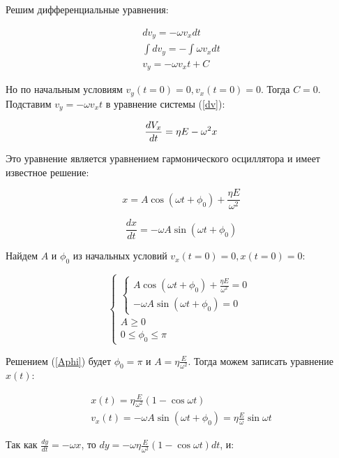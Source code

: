 Решим дифференциальные уравнения:

\begin{gather}
	\label{diff}
	 dv_y=-\omega{}v_x{}dt\\
	 \int dv_y=-\int\omega{}v_x{}dt\\
	 v_y=-\omega{}v_x{}t+C
\end{gather}

Но по начальным условиям $v_y(t=0)=0,v_x(t=0)=0$. Тогда $C=0$. Подставим $v_y=-\omega{}v_x{}t$ в уравнение системы (\ref{dv}):

\begin{equation}
	\frac{dV_x}{dt}=\eta{}E-\omega^2{}x\\
\end{equation}

Это уравнение является уравнением гармонического осциллятора и имеет известное решение:

\begin{equation}
	x=A\cos{(\omega{t}+\phi_0)}+\frac{\eta{E}}{\omega^2}
\end{equation}

\begin{equation}
	\frac{dx}{dt}=-\omega{A}\sin{(\omega{t}+\phi_0)}
\end{equation}

Найдем $A$ и $\phi_0$ из начальных условий $v_x(t=0)=0, x(t=0)=0$:

\begin{equation}
\label{Aphi}
 \begin{cases}
    \begin{cases}
   		A\cos{(\omega{t}+\phi_0)}+\frac{\eta{E}}{\omega^2}=0\\
   		-\omega{A}\sin{(\omega{t}+\phi_0)}=0
 	\end{cases}\\
 	A\geq0\\
 	0\leq\phi_0\leq\pi
 \end{cases}
\end{equation}

Решением (\ref{Aphi}) будет $\phi_0=\pi$ и $A=\eta\frac{E}{\omega^2}$. Тогда можем записать уравнение $x(t)$:

\begin{gather}
	x(t)=\eta\frac{E}{\omega^2}(1-\cos{\omega{t}})\\
	v_x(t)=-\omega{A}\sin{(\omega{t}+\phi_0)}=\eta\frac{E}{\omega}\sin{\omega{t}}
\end{gather}

Так как $\frac{dy}{dt}=-\omega{x}$, то $dy=-\omega\eta\frac{E}{\omega^2}(1-\cos{\omega{t}}){dt}$, и:

